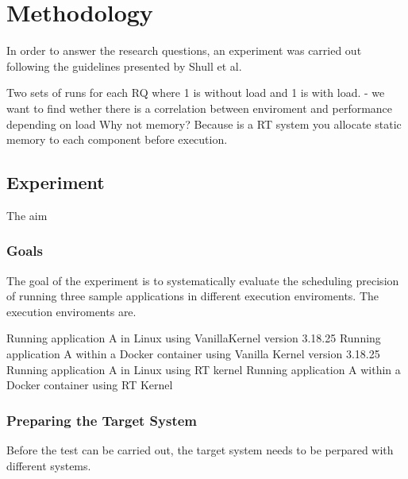 \chapter{Methodology}

In order to answer the research questions, an experiment was carried out following the guidelines presented by Shull et al. 

Two sets of runs for each RQ where 1 is without load and 1 is with load. 
	- we want to find wether there is a correlation between enviroment and performance depending on load 
Why not memory? Because is a RT system you allocate static memory to each component before execution. 

\section{Experiment}
The aim 

\subsection{Goals}
The goal of the experiment is to systematically evaluate the scheduling precision of running three sample applications in different execution enviroments. The execution enviroments are. 

Running application A in Linux using VanillaKernel version 3.18.25
Running application A within a Docker container using Vanilla Kernel version 3.18.25
Running application A in Linux using RT kernel 
Running application A within a Docker container using RT Kernel 

\subsection{Preparing the Target System}
Before the test can be carried out, the target system needs to be perpared with different systems. 

